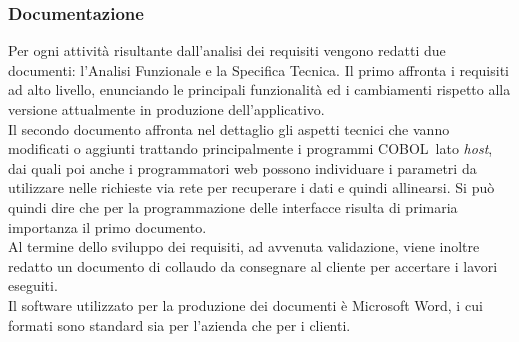 	\subsubsection{Documentazione}
	Per ogni attività risultante dall'analisi dei requisiti vengono redatti due documenti: l'Analisi Funzionale e la Specifica Tecnica.
	Il primo affronta i requisiti ad alto livello, enunciando le principali funzionalità ed i cambiamenti rispetto alla versione attualmente in produzione dell'applicativo. \\
	
	
	Il secondo documento affronta nel dettaglio gli aspetti tecnici che vanno modificati o aggiunti trattando principalmente i programmi COBOL\glossario\ lato \textit{host}, dai quali poi anche i programmatori web possono individuare i parametri da utilizzare nelle richieste via rete per recuperare i dati e quindi allinearsi. Si può quindi dire che per la programmazione delle interfacce risulta di primaria importanza il primo documento. \\
	
	Al termine dello sviluppo dei requisiti, ad avvenuta validazione, viene inoltre redatto un documento di collaudo da consegnare al cliente per accertare i lavori eseguiti. \\
	
	Il software utilizzato per la produzione dei documenti è Microsoft Word, i cui formati sono standard sia per l'azienda che per i clienti.
	
	
